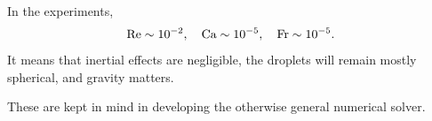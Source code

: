 \begin{frame}
\begin{columns}[T]
\begin{column}{0.4\textwidth}
      \pause
      \begin{flushleft}
        In the experiments, %
        \begin{equation} \notag
          \begin{aligned}
            \textrm{Re} \sim 10^{-2}, \quad
            \textrm{Ca} \sim 10^{-5}, \quad
            \textrm{Fr} \sim 10^{-5}.  
          \end{aligned}
        \end{equation}
        It means that inertial effects are negligible,
        the droplets will remain mostly spherical,
        and gravity matters.
        \vskip0.4cm

        \pause
        These are kept in mind in developing the otherwise general numerical solver.
      \end{flushleft}
    \end{column}
    
  \end{columns}
  
\end{frame}

